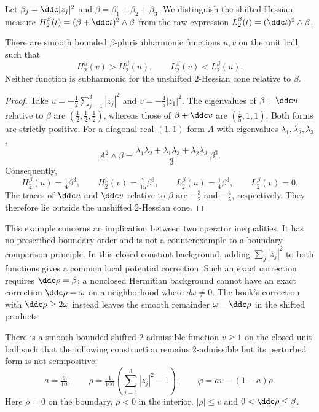
Let $\beta_j=\ddc|z_j|^2$ and $\beta=\beta_1+\beta_2+\beta_3$.
We distinguish the shifted Hessian measure
$H_2^\beta(t)=(\beta+\ddc t)^2\wedge\beta$ from the raw expression
$L_2^\beta(t)=(\ddc t)^2\wedge\beta$.

\begin{lemma}\label{draft635:shifted-raw-order}
There are smooth bounded $\beta$-plurisubharmonic functions $u,v$ on
the unit ball such that
\[
 H_2^\beta(v)>H_2^\beta(u),\qquad
 L_2^\beta(v)<L_2^\beta(u).
\]
Neither function is subharmonic for the unshifted $2$-Hessian cone
relative to $\beta$.
\end{lemma}

\begin{proof}
Take $u=-\tfrac12\sum_{j=1}^3|z_j|^2$ and
$v=-\tfrac45|z_1|^2$.
The eigenvalues of $\beta+\ddc u$ relative to $\beta$ are
$(\tfrac12,\tfrac12,\tfrac12)$, whereas those of
$\beta+\ddc v$ are $(\tfrac15,1,1)$.
Both forms are strictly positive. For a diagonal real $(1,1)$-form
$A$ with eigenvalues $\lambda_1,\lambda_2,\lambda_3$,
\[
 A^2\wedge\beta
 =\frac{\lambda_1\lambda_2+\lambda_1\lambda_3+
         \lambda_2\lambda_3}{3}\,\beta^3.
\]
Consequently,
\[
 H_2^\beta(u)=\tfrac14\beta^3,
 \qquad H_2^\beta(v)=\tfrac7{15}\beta^3,
 \qquad L_2^\beta(u)=\tfrac14\beta^3,
 \qquad L_2^\beta(v)=0.
\]
The traces of $\ddc u$ and $\ddc v$ relative to $\beta$ are
$-\tfrac32$ and $-\tfrac45$, respectively. They therefore lie
outside the unshifted $2$-Hessian cone.
\end{proof}

This example concerns an implication between two operator inequalities.
It has no prescribed boundary order and is not a counterexample to
a boundary comparison principle. In this closed constant background,
adding $\sum_j|z_j|^2$ to both functions gives a common local potential
correction. Such an exact correction requires $\ddc\rho=\beta$;
a nonclosed Hermitian background cannot have an exact correction
$\ddc\rho=\omega$ on a neighborhood where $d\omega\ne0$.
The book's correction with $\ddc\rho\geq2\omega$ instead leaves the
smooth remainder $\omega-\ddc\rho$ in the shifted products.

\begin{lemma}\label{draft635:admissible-not-positive}
There is a smooth bounded shifted $2$-admissible function $v\geq1$
on the closed unit ball such that the following construction remains
$2$-admissible but its perturbed form is not semipositive:
\[
 a=\tfrac9{10},\qquad
 \rho=\tfrac1{100}\left(\sum_{j=1}^3|z_j|^2-1\right),
 \qquad \varphi=av-(1-a)\rho.
\]
Here $\rho=0$ on the boundary, $\rho<0$ in the interior,
$|\rho|\leq v$ and $0<\ddc\rho\leq\beta$.
\end{lemma}

